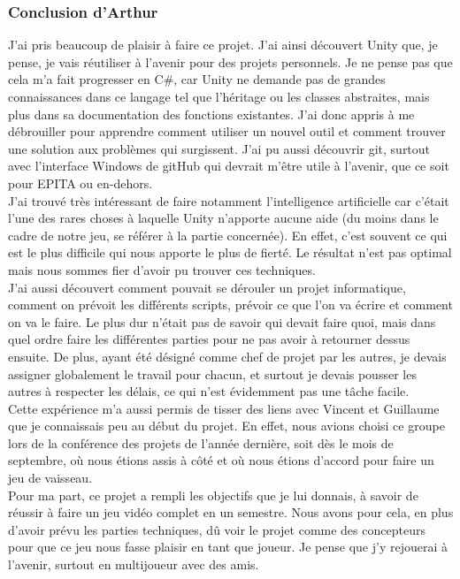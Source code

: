 \documentclass[12pt, titlepage]{article}
\begin{document}
\begin{spacing}{1.5}
\subsubsection{Conclusion d'Arthur}

J'ai pris beaucoup de plaisir à faire ce projet. J'ai ainsi découvert Unity que, je pense, je vais réutiliser à l'avenir pour des projets personnels. Je ne pense pas que cela m'a fait progresser en C\#, car Unity ne demande pas de grandes connaissances dans ce langage tel que l'héritage ou les classes abstraites, mais plus dans sa documentation des fonctions existantes. J'ai donc appris à me débrouiller pour apprendre comment utiliser un nouvel outil et comment trouver une solution aux problèmes qui surgissent. J'ai pu aussi découvrir git, surtout avec l'interface Windows de gitHub qui devrait m'être utile à l'avenir, que ce soit pour EPITA ou en-dehors.\\

J'ai trouvé très intéressant de faire notamment l'intelligence artificielle car c'était l'une des rares choses à laquelle Unity n'apporte aucune aide (du moins dans le cadre de notre jeu, se référer à la partie concernée). En effet, c'est souvent ce qui est le plus difficile qui nous apporte le plus de fierté. Le résultat n'est pas optimal mais nous sommes fier d'avoir pu trouver ces techniques.\\

J'ai aussi découvert comment pouvait se dérouler un projet informatique, comment on prévoit les différents scripts, prévoir ce que l'on va écrire et comment on va le faire. Le plus dur n'était pas de savoir qui devait faire quoi, mais dans quel ordre faire les différentes parties pour ne pas avoir à retourner dessus ensuite. De plus, ayant été désigné comme chef de projet par les autres, je devais assigner globalement le travail pour chacun, et surtout je devais pousser les autres à respecter les délais, ce qui n'est évidemment pas une tâche facile.\\

Cette expérience m'a aussi permis de tisser des liens avec Vincent et Guillaume que je connaissais peu au début du projet. En effet, nous avions choisi ce groupe lors de la conférence des projets de l'année dernière, soit dès le mois de septembre, où nous étions assis à côté et où nous étions d'accord pour faire un jeu de vaisseau.\\

Pour ma part, ce projet a rempli les objectifs que je lui donnais, à savoir de réussir à faire un jeu vidéo complet en un semestre. Nous avons pour cela, en plus d'avoir prévu les parties techniques, dû voir le projet comme des concepteurs pour que ce jeu nous fasse plaisir en tant que joueur. Je pense que j'y rejouerai à l'avenir, surtout en multijoueur avec des amis.\\


\end{spacing}
\end{document}
